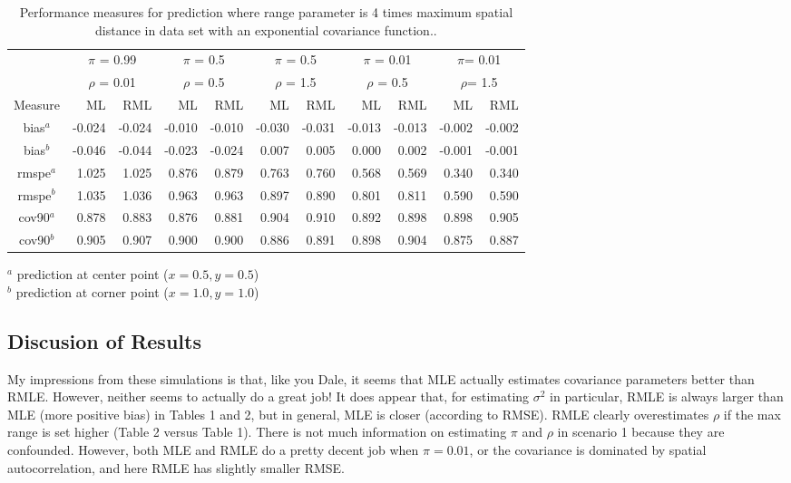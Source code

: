 \documentclass[12pt, titlepage]{article}
\begin{document}
\begin{table}[h]
				\caption{Performance measures for prediction where range parameter is 4 times maximum spatial distance in data set with an exponential covariance function..}
\begin{center}
\begin{tabular}{c|rr|rr|rr|rr|rr}
  \hline
  \hline
  & \multicolumn{2}{|c|}{$\pi$ = 0.99} & \multicolumn{2}{|c|}{$\pi$ = 0.5}  
  & \multicolumn{2}{|c|}{$\pi$ = 0.5} & \multicolumn{2}{|c}{$\pi$ = 0.01} 
  & \multicolumn{2}{|c}{$\pi$= 0.01} \\
  & \multicolumn{2}{|c|}{$\rho$ = 0.01} & \multicolumn{2}{|c|}{$\rho$ = 0.5}  
  & \multicolumn{2}{|c|}{$\rho$ = 1.5} & \multicolumn{2}{|c}{$\rho$ = 0.5} 
  & \multicolumn{2}{|c}{$\rho$= 1.5} \\
  Measure & ML & RML & ML & RML & ML & RML & ML & RML & ML & RML \\
	\hline
  \hline	
	bias$^a$ & -0.024 & -0.024 & -0.010 & -0.010 & -0.030 & -0.031 & -0.013 & -0.013 & -0.002 & -0.002 \\ 
  bias$^b$ & -0.046 & -0.044 & -0.023 & -0.024 & 0.007 & 0.005 & 0.000 & 0.002 & -0.001 & -0.001 \\ 
  rmspe$^a$ & 1.025 & 1.025 & 0.876 & 0.879 & 0.763 & 0.760 & 0.568 & 0.569 & 0.340 & 0.340 \\ 
  rmspe$^b$ & 1.035 & 1.036 & 0.963 & 0.963 & 0.897 & 0.890 & 0.801 & 0.811 & 0.590 & 0.590 \\ 
  cov90$^a$ & 0.878 & 0.883 & 0.876 & 0.881 & 0.904 & 0.910 & 0.892 & 0.898 & 0.898 & 0.905 \\ 
  cov90$^b$ & 0.905 & 0.907 & 0.900 & 0.900 & 0.886 & 0.891 & 0.898 & 0.904 & 0.875 & 0.887 \\ 
	\hline
  \hline
\end{tabular}
\end{center}
$^a$ prediction at center point ($x = 0.5, y = 0.5$) \\
$^b$ prediction at corner point ($x = 1.0, y = 1.0$)
\end{table}

\clearpage
\newpage
\subsection*{Discusion of Results}

My impressions from these simulations is that, like you Dale, it seems that MLE actually estimates covariance parameters better than RMLE.  However, neither seems to actually do a great job!  It does appear that, for estimating $\sigma^2$ in particular, RMLE is always larger than MLE (more positive bias) in Tables 1 and 2, but in general, MLE is closer (according to RMSE).  RMLE clearly overestimates $\rho$ if the max range is set higher (Table 2 versus Table 1).  There is not much information on estimating $\pi$ and $\rho$ in scenario 1 because they are confounded.  However, both MLE and RMLE do a pretty decent job when $\pi = 0.01$, or the covariance is dominated by spatial autocorrelation, and here RMLE has slightly smaller RMSE.
\end{document}
